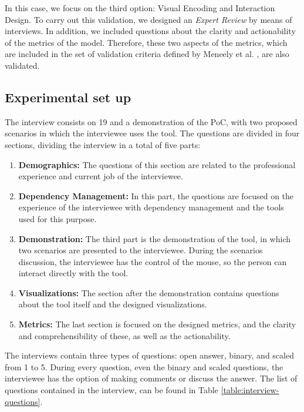 In this case, we focus on the third option: Visual Encoding and Interaction Design. To carry out this validation, we designed an \textit{Expert Review} by means of interviews. In addition, we included questions about the clarity and actionability of the metrics of the model. Therefore, these two aspects of the metrics, which are included in the set of validation criteria defined by Meneely et al. \cite{Meneely2012}, are also validated.

\subsection{Experimental set up}
The interview consists on 19 and a demonstration of the PoC, with two proposed scenarios in which the interviewee uses the tool. The questions are divided in four sections, dividing the interview in a total of five parts:

\begin{enumerate}
  \item \textbf{Demographics:} The questions of this section are related to the professional experience and current job of the interviewee.
  \item \textbf{Dependency Management:} In this part, the questions are focused on the experience of the interviewee with dependency management and the tools used for this purpose.
  \item \textbf{Demonstration:} The third part is the demonstration of the tool, in which two scenarios are presented to the interviewee. During the scenarios discussion, the interviewee has the control of the mouse, so the person can interact directly with the tool.
  \item \textbf{Visualizations:} The section after the demonstration contains questions about the tool itself and the designed visualizations.
  \item \textbf{Metrics:} The last section is focused on the designed metrics, and the clarity and comprehensibility of these, as well as the actionability.
\end{enumerate}

The interviews contain three types of questions: open answer, binary, and scaled from 1 to 5. During every question, even the binary and scaled questions, the interviewee has the option of making comments or discuss the answer. The list of questions contained in the interview, can be found in Table \ref{table:interview-questions}.

